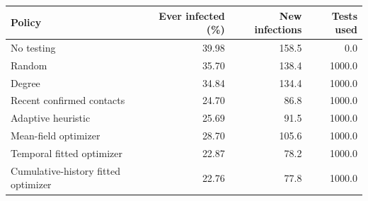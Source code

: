 \begin{tabular}{lrrr}\toprule
Policy & Ever infected (\%) & New infections & Tests used \\ \midrule
No testing & 39.98 & 158.5 & 0.0 \\
Random & 35.70 & 138.4 & 1000.0 \\
Degree & 34.84 & 134.4 & 1000.0 \\
Recent confirmed contacts & 24.70 & 86.8 & 1000.0 \\
Adaptive heuristic & 25.69 & 91.5 & 1000.0 \\
Mean-field optimizer & 28.70 & 105.6 & 1000.0 \\
Temporal fitted optimizer & 22.87 & 78.2 & 1000.0 \\
Cumulative-history fitted optimizer & 22.76 & 77.8 & 1000.0 \\
\bottomrule\end{tabular}